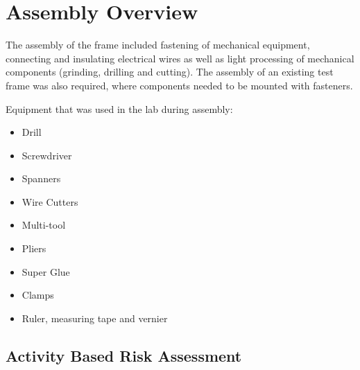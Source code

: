 \section*{Assembly Overview}

The assembly of the frame included fastening of mechanical equipment, connecting and insulating electrical wires as well as light processing of mechanical components (grinding, drilling and cutting). The assembly of an existing test frame was also required, where components needed to be mounted with fasteners.

Equipment that was used in the lab during assembly:
\begin{multicols}{2}
	\begin{itemize}
		\item Drill
		\item Screwdriver
		\item Spanners
		\item Wire Cutters
		\item Multi-tool
		\item Pliers
		\item Super Glue
		\item Clamps
		\item Ruler, measuring tape and vernier
	\end{itemize}
\end{multicols}

\subsection*{Activity Based Risk Assessment}

